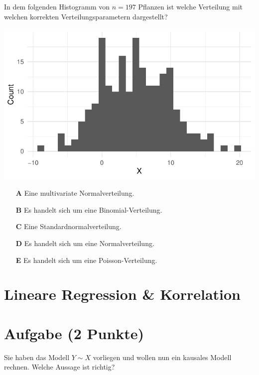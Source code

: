 \documentclass[a4paper, 9pt]{scrartcl}\usepackage[]{graphicx}\usepackage[]{xcolor}
\makeatletter
\def\maxwidth{ %
  \ifdim\Gin@nat@width>\linewidth
    \linewidth
  \else
    \Gin@nat@width
  \fi
}
\makeatother
\begin{document}
In dem folgenden Histogramm von $n = 197$ Pflanzen ist welche
Verteilung mit welchen korrekten Verteilungsparametern dargestellt?



{\centering \includegraphics[width=\maxwidth]{img/mc-distribution-02-a-1} 

}







\begin{enumerate}
\item [\textbf{A} \msquare] Eine multivariate Normalverteilung.
\item [\textbf{B} \msquare] Es handelt sich um eine Binomial-Verteilung.
\item [\textbf{C} \msquare] Eine Standardnormalverteilung.
\item [\textbf{D} \msquare] Es handelt sich um eine Normalverteilung.
\item [\textbf{E} \msquare] Es handelt sich um eine Poisson-Verteilung.
\end{enumerate} 
\section*{Lineare Regression \& Korrelation}

\section{Aufgabe \hfill (2 Punkte)}




Sie haben das Modell $Y \sim X$ vorliegen und wollen nun ein
kausales Modell rechnen. Welche Aussage ist richtig?
\end{document}
